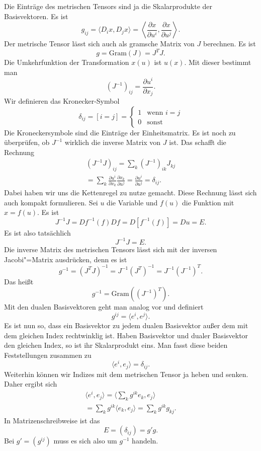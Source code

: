 \documentclass[a4paper,10pt,fleqn,twocolumn,twoside]{article}
\begin{document}
Die Einträge des metrischen Tensors sind ja die Skalarprodukte der
Basisvektoren. Es ist
\[g_{ij} = \langle D_i x, D_j x\rangle
=  \left\langle \frac{\partial x}{\partial u^i},
\frac{\partial x}{\partial u^j}\right\rangle.\]
Der metrische Tensor lässt sich auch als gramsche Matrix von \(J\)
berechnen. Es ist
\[g = \mathrm{Gram}(J) = J^T\!J.\]
Die Umkehrfunktion der Transformation \(x(u)\) ist \(u(x)\).
Mit dieser bestimmt man
\[(J^{-1})_{ij} = \frac{\partial u^i}{\partial x_j}.\]
Wir definieren das Kronecker-Symbol
\[\delta_{ij} = [i=j]
= \begin{cases}
1 & \mathrm{wenn}\,\,i=j\\
0 & \mathrm{sonst}
\end{cases}\]
Die Kroneckersymbole sind die Einträge der Einheitsmatrix.
Es ist noch zu überprüfen, ob \(J^{-1}\) wirklich die inverse Matrix
von \(J\) ist. Das schafft die Rechnung
\begin{gather*}
(J^{-1}J)_{ij} = \sum_{k}(J^{-1})_{ik}J_{kj}\\
= \sum_{k} \frac{\partial u^i}{\partial x_k}
\frac{\partial x_k}{\partial u^j}
= \frac{\partial u^i}{\partial u^j}
= \delta_{ij}.
\end{gather*}
Dabei haben wir uns die Kettenregel zu nutze gemacht. Diese Rechnung
lässt sich auch kompakt formulieren. Sei \(u\) die Variable und
\(f(u)\) die Funktion mit \(x=f(u)\). Es ist
\[J^{-1}J = Df^{-1}(f)Df = D[f^{-1}(f)] = Du = E.\]
Es ist also tatsächlich
\[J^{-1}J = E.\]
Die inverse Matrix des metrischen Tensors lässt sich mit der inversen
Jacobi"=Matrix ausdrücken, denn es ist
\[g^{-1} = (J^T\!J)^{-1} = J^{-1}(J^T)^{-1} = J^{-1}(J^{-1})^T.\]
Das heißt
\[g^{-1} = \mathrm{Gram}((J^{-1})^T).\]
%
Mit den dualen Basisvektoren geht man analog vor und definiert
\[g^{ij} = \langle e^i, e^j\rangle.\]
Es ist nun so, dass ein Basisvektor zu jedem dualen Basisvektor außer
dem mit dem gleichen Index rechtwinklig ist. Haben Basisvektor und
dualer Basisvektor den gleichen Index, so ist ihr Skalarprodukt eins.
Man fasst diese beiden Feststellungen zusammen zu
\[\langle e^i,e_j\rangle = \delta_{ij}.\]
%
Weiterhin können wir Indizes mit dem metrischen Tensor ja heben und
senken. Daher ergibt sich
\begin{gather*}\langle e^i,e_j\rangle
= \langle \sum_{k} g^{ik}e_k,e_j\rangle\\
= \sum_{k}g^{ik}\langle e_k,e_j\rangle
= \sum_{k}g^{ik}g_{kj}.
\end{gather*}
In Matrizenschreibweise ist das
\[E = (\delta_{ij}) =  g'g.\]
Bei \(g'=(g^{ij})\) muss es sich also um \(g^{-1}\) handeln.
\end{document}
